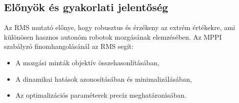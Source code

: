 \subsection{Előnyök és gyakorlati jelentőség}
Az RMS mutató előnye, hogy robusztus és érzékeny az extrém értékekre, ami különösen hasznos autonóm robotok mozgásának elemzésében. Az MPPI szabályzó finomhangolásánál az RMS segít:
\begin{itemize}
    \item A mozgási minták objektív összehasonlításában,
    \item A dinamikai hatások azonosításában és minimalizálásában,
    \item Az optimalizációs paraméterek precíz meghatározásában.
\end{itemize}
